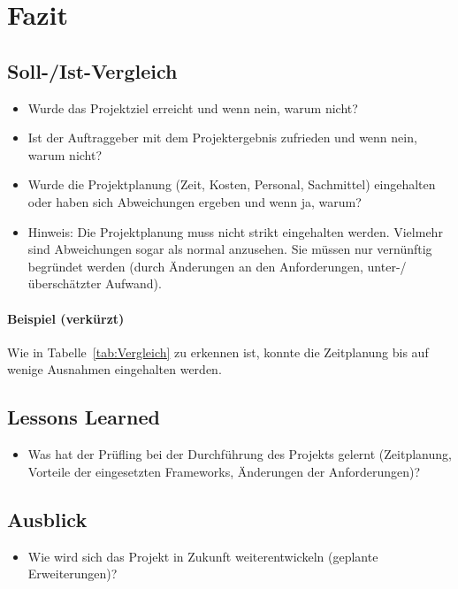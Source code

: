 \section{Fazit} 
\label{sec:Fazit}

\subsection{Soll-/Ist-Vergleich}
\label{sec:SollIstVergleich}

\begin{itemize}[label=--]
	\item Wurde das Projektziel erreicht und wenn nein, warum nicht?
	\item Ist der Auftraggeber mit dem Projektergebnis zufrieden und wenn nein, warum nicht?
	\item Wurde die Projektplanung (Zeit, Kosten, Personal, Sachmittel) eingehalten oder haben sich Abweichungen ergeben und wenn ja, warum?
	\item Hinweis: Die Projektplanung muss nicht strikt eingehalten werden. Vielmehr sind Abweichungen sogar als normal anzusehen. Sie müssen nur vernünftig begründet werden (\zB durch Änderungen an den Anforderungen, unter-/überschätzter Aufwand).
\end{itemize}

\paragraph{Beispiel (verkürzt)}
Wie in Tabelle~\ref{tab:Vergleich} zu erkennen ist, konnte die Zeitplanung bis auf wenige Ausnahmen eingehalten werden.


\subsection{Lessons Learned}
\label{sec:LessonsLearned}

\begin{itemize}[label=--]
	\item Was hat der Prüfling bei der Durchführung des Projekts gelernt (\zB Zeitplanung, Vorteile der eingesetzten Frameworks, Änderungen der Anforderungen)?
\end{itemize}


\subsection{Ausblick}
\label{sec:Ausblick}

\begin{itemize}[label=--]
	\item Wie wird sich das Projekt in Zukunft weiterentwickeln (\zB geplante Erweiterungen)?
\end{itemize}
